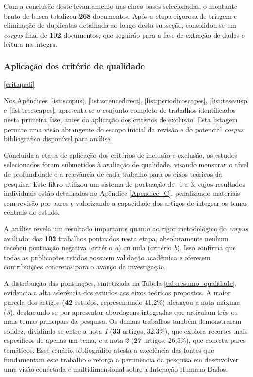 \documentclass[
	12pt,				%
	oneside,			%
	a4paper,			%
	english,			%
	brazil				%
	]{abntex2ppgsi}
\begin{document}
    Com a conclusão deste levantamento nas cinco bases selecionadas, o montante bruto de busca totalizou \textbf{268} documentos. Após a etapa rigorosa de triagem e eliminação de duplicatas detalhada ao longo desta subseção, consolidou-se um \textit{corpus} final de \textbf{102} documentos, que seguirão para a fase de extração de dados e leitura na íntegra.


     \subsubsection{Aplicação dos critério de qualidade}\ref{crit:quali}
     
    Nos Apêndices \ref{list:scopus}, \ref{list:sciencedirect}, \ref{list:periodicoscapes}, \ref{list:tesesusp} e \ref{list:tesescapes}, apresenta-se o conjunto completo de trabalhos identificados nesta primeira fase, antes da aplicação dos critérios de exclusão. Esta listagem permite uma visão abrangente do escopo inicial da revisão e do potencial \textit{corpus} bibliográfico disponível para análise.

    Concluída a etapa de aplicação dos critérios de inclusão e exclusão, os estudos selecionados foram submetidos à avaliação de qualidade, visando mensurar o nível de profundidade e a relevância de cada trabalho para os eixos teóricos da pesquisa. Este filtro utilizou um sistema de pontuação de -1 a 3, cujos resultados individuais estão detalhados no Apêndice \ref{Apendice_C}, penalizando materiais sem revisão por pares e valorizando a capacidade dos artigos de integrar os temas centrais do estudo.

    A análise revela um resultado importante quanto ao rigor metodológico do \textit{corpus} avaliado: dos \textbf{102} trabalhos pontuados nesta etapa, absolutamente nenhum recebeu pontuação negativa (critério \textit{a}) ou nula (critério \textit{b}). Isso confirma que todas as publicações retidas possuem validação acadêmica e oferecem contribuições concretas para o avanço da investigação.

    A distribuição das pontuações, sintetizada na Tabela \ref{tab:resumo_qualidade}, evidencia a alta aderência dos estudos aos eixos teóricos propostos. A maior parcela dos artigos (\textbf{42} estudos, representando 41,2\%) alcançou a nota máxima (\emph{3}), destacando-se por apresentar abordagens integradas que articulam três ou mais temas principais da pesquisa. Os demais trabalhos também demonstraram solidez, dividindo-se entre a nota \emph{1} (\textbf{33} artigos, 32,3\%), que explora recortes mais específicos de apenas um tema, e a nota \emph{2} (\textbf{27} artigos, 26,5\%), que conecta pares temáticos. Esse cenário bibliográfico atesta a excelência das fontes que fundamentam este trabalho e reforça a pertinência da pesquisa em desenvolver uma visão conectada e multidimensional sobre a Interação Humano-Dados.
\end{document}
